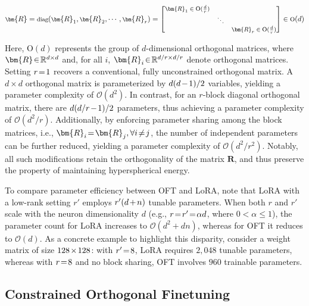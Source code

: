 \begin{equation}
    \footnotesize
    \bm{R}=\text{diag}(\bm{R}_1,\bm{R}_2,\cdots,\bm{R}_r)=\begin{bmatrix}
    \bm{R}_1\in \text{O}(\frac{d}{r}) &  &\\
    &\ddots & \\
    & & \bm{R}_r\in \text{O}(\frac{d}{r})
    \end{bmatrix}\in \text{O}(d)
\end{equation}

Here, $\text{O}(d)$ represents the group of $d$-dimensional orthogonal matrices, where $\thickmuskip=2mu \medmuskip=2mu \bm{R} \in \mathbb{R}^{d\times d}$ and, for all $i$, $\thickmuskip=2mu \medmuskip=2mu \bm{R}_i \in \mathbb{R}^{d/r\times d/r}$ denote orthogonal matrices. Setting $\thickmuskip=2mu \medmuskip=2mu r=1$ recovers a conventional, fully unconstrained orthogonal matrix. A $d \times d$ orthogonal matrix is parameterized by $\thickmuskip=2mu \medmuskip=2mu d(d-1)/2$ variables, yielding a parameter complexity of $\mathcal{O}(d^2)$. In contrast, for an $r$-block diagonal orthogonal matrix, there are $\thickmuskip=2mu \medmuskip=2mu d(d/r-1)/2$ parameters, thus achieving a parameter complexity of $\mathcal{O}(d^2/r)$. Additionally, by enforcing parameter sharing among the block matrices, i.e., $\thickmuskip=2mu \medmuskip=2mu\bm{R}_i = \bm{R}_j, \forall i\neq j$, the number of independent parameters can be further reduced, yielding a parameter complexity of $\mathcal{O}(d^2/r^2)$. Notably, all such modifications retain the orthogonality of the matrix $\bm{R}$, and thus preserve the property of maintaining hyperspherical energy.

To compare parameter efficiency between OFT and LoRA, note that LoRA with a low-rank setting $r'$ employs $\thickmuskip=2mu \medmuskip=2mu r'(d+n)$ tunable parameters. When both $r$ and $r'$ scale with the neuron dimensionality $d$ (e.g., $\thickmuskip=2mu \medmuskip=2mu r=r'=\alpha d$, where $0<\alpha\leq 1$), the parameter count for LoRA increases to $\mathcal{O}(d^2+dn)$, whereas for OFT it reduces to $\mathcal{O}(d)$. As a concrete example to highlight this disparity, consider a weight matrix of size $\thickmuskip=2mu \medmuskip=2mu 128\times128$: with $\thickmuskip=2mu \medmuskip=2mu r'=8$, LoRA requires $2,048$ tunable parameters, whereas with $\thickmuskip=2mu \medmuskip=2mu r=8$ and no block sharing, OFT involves $960$ trainable parameters.

\subsection{Constrained Orthogonal Finetuning}

